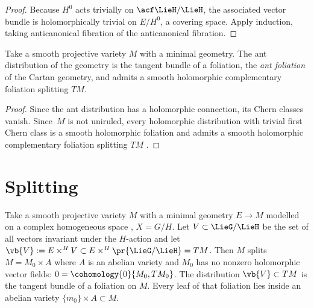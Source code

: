 \begin{proof}
Because $H^0$ acts trivially on $\acf\LieH/\LieH$, the associated vector bundle is
holomorphically trivial on $E/H^0$, a covering space.
Apply induction, taking anticanonical fibration of the anticanonical fibration.
\end{proof}

\begin{Lemma}
Take a smooth projective variety $M$ with a minimal geometry.
The ant distribution of the geometry is the tangent bundle of a foliation, the \emph{ant foliation} of the Cartan geometry, and admits a smooth holomorphic complementary foliation splitting $TM$.
\end{Lemma}

\begin{proof}
Since the ant distribution has a holomorphic connection, its Chern classes vanish.
Since~$M$ is not uniruled, every holomorphic distribution with trivial first Chern class is a smooth holomorphic foliation and admits a smooth holomorphic complementary foliation splitting $TM$ \cite[Theorem 5.2]{Loray/Pereira/Touzet:2011}.
\end{proof}

\section{Splitting}\label{section:splitting}

\begin{Lemma}\label{lemma:symmetry.splitting}
Take a smooth projective variety $M$ with a minimal geometry $E \to M$ modelled on a complex homogeneous space , $X = G/H$.
Let $V \subset \LieG/\LieH$ be the set of all vectors invariant under the $H$-action and let $\vb{V}:= E \times^H V \subset E \times^H \pr{\LieG/\LieH} = TM$.
Then $M$ splits~${M = M_0 \times A}$ where $A$ is an abelian variety and $M_0$ has no nonzero holomorphic vector fields: $0=\cohomology{0}{M_0,TM_0}$.
The distribution $\vb{V} \subset TM$ is the tangent bundle of a foliation on $M$.
Every leaf of that foliation lies inside an abelian variety $\{m_0\} \times A \subset M$.
\end{Lemma}

